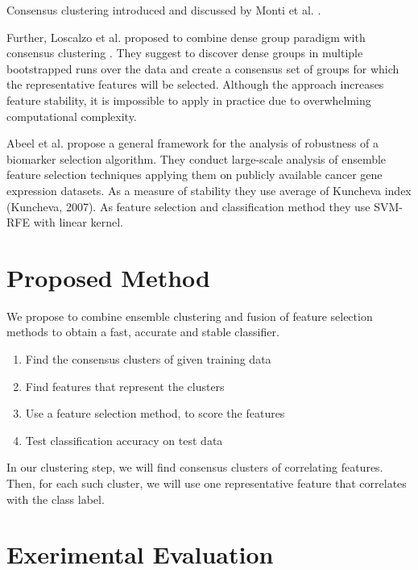 \documentclass{llncs}
\begin{document}
Consensus clustering introduced and discussed by Monti et al. \cite{monti2003consensus}.

Further, Loscalzo et al. proposed to combine dense group paradigm with consensus clustering \cite{loscalzo2009consensus}. They suggest to discover dense groups in multiple bootstrapped runs over the data and create a consensus set of groups for which the representative features will be selected. Although the approach increases feature stability, it is impossible to apply in practice due to overwhelming computational complexity.



Abeel et al. \cite{abeel2010robust} propose a general framework for the analysis of robustness of a biomarker selection algorithm. They conduct large-scale analysis of ensemble feature selection techniques applying them on publicly available cancer gene expression datasets. As a measure of stability they use average of Kuncheva index (Kuncheva, 2007). As feature selection and classification method they use SVM-RFE with linear kernel. 




\section{Proposed Method}

We propose to combine ensemble clustering and fusion of feature selection methods to obtain a fast, accurate and stable classifier.

\begin{enumerate}
	\item Find the consensus clusters of given training data
	\item Find features that represent the clusters
	\item Use a feature selection method, to score the features 
	\item Test classification accuracy on test data
\end{enumerate}

In our clustering step, we will find consensus clusters of correlating features. Then, for each such cluster, we will use one representative feature that correlates with the class label. 


\section{Exerimental Evaluation}
\end{document}

